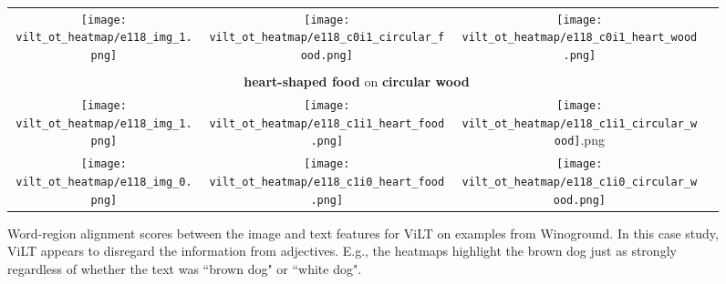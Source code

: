 \documentclass[10pt,twocolumn,letterpaper]{article}
\begin{document}
\begin{figure*}[t]
\begin{minipage}{0.48\textwidth}
{\begin{tabular}{cccc}
\texttt{[image: vilt\_ot\_heatmap/e118\_img\_1.png]}& \texttt{[image: vilt\_ot\_heatmap/e118\_c0i1\_circular\_food.png]} & \texttt{[image: vilt\_ot\_heatmap/e118\_c0i1\_heart\_wood.png]} \\
             & & & \\
\multicolumn{3}{c}{ \textbf{heart-shaped food} on \textbf{circular wood}}\\
\texttt{[image: vilt\_ot\_heatmap/e118\_img\_1.png]}& \texttt{[image: vilt\_ot\_heatmap/e118\_c1i1\_heart\_food.png]} & \texttt{[image: vilt\_ot\_heatmap/e118\_c1i1\_circular\_wood]}.png \\
\texttt{[image: vilt\_ot\_heatmap/e118\_img\_0.png]}& \texttt{[image: vilt\_ot\_heatmap/e118\_c1i0\_heart\_food.png]} & \texttt{[image: vilt\_ot\_heatmap/e118\_c1i0\_circular\_wood.png]} \\
            \end{tabular}
        }
    \end{minipage}
    
    \caption{Word-region alignment scores between the image and text features for ViLT \cite{kim2021vilt} on examples from Winoground. In this case study, ViLT appears to disregard the information from adjectives. E.g., the heatmaps highlight the brown dog just as strongly regardless of whether the text was ``brown dog" or ``white dog".}
    \label{fig:vilt-heatmap}
\end{figure*}
\end{document}
